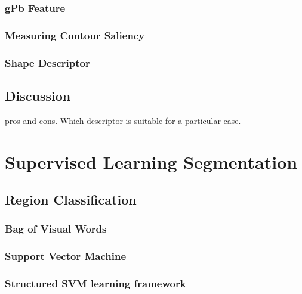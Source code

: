 \documentclass{SMBV12}
\begin{document}
\subsubsection{gPb Feature}

\subsubsection{Measuring Contour Saliency}

\cite{arbelaez2009contours}

\subsubsection{Shape Descriptor}

\cite{gu2009recognition}

\subsection{Discussion}

pros and cons. Which descriptor is suitable for a particular case.




\section{Supervised Learning Segmentation}

\subsection{Region Classification}

\subsubsection{Bag of Visual Words}

\subsubsection{Support Vector Machine}

\subsubsection{Structured SVM learning framework}
\end{document}
